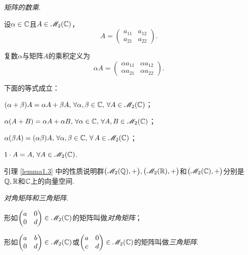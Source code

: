   \begin{definition}
    \emph{矩阵的数乘}.

    设$\alpha\in\mathbb C$且$A\in\mathscr M_2(\mathbb C)$，
    \[
      A = \begin{pmatrix}
        a_{11} & a_{12} \\
        a_{21} & a_{22}
      \end{pmatrix}.
    \]

    复数$\alpha$与矩阵$A$的乘积定义为
    \[
      \alpha A = \begin{pmatrix}
        \alpha a_{11} & \alpha a_{12}\\
        \alpha a_{21} & \alpha a_{22}
      \end{pmatrix}.
    \]
  \end{definition}

  \begin{lemma}
    下面的等式成立：
    \begin{enum}
      \item $(\alpha+\beta)A=\alpha A+\beta A,\,\forall \alpha,\beta\in\mathbb C,\,\forall A\in\mathscr M_2(\mathbb C)$；
      \item $\alpha(A+B)=\alpha A+\alpha B,\,\forall \alpha\in\mathbb C,\,\forall A,B\in\mathscr M_2(\mathbb C)$；
      \item $\alpha(\beta A)=(\alpha\beta)A,\,\forall\alpha,\beta\in\mathbb C,\,\forall
          \,A\in\mathscr M_2(\mathbb C)$；
      \item $1\cdot A=A,\,\forall A\in\mathscr M_2(\mathbb C)$.
    \end{enum}
  \end{lemma}

  \begin{remark}
    引理 \ref{lemma1.3} 中的性质说明群$\big( \mathscr M_2(\mathbb Q),+ \big),\big(\mathscr M_2(\mathbb R),+\big)$和$\big(\mathscr M_2(\mathbb C),+\big)$分别是$\mathbb Q,\mathbb R$和$\mathbb C$上的向量空间.
  \end{remark}

  \begin{definition}
    \emph{对角矩阵和三角矩阵}.
    \begin{eenum}
      \item 形如$\begin{pmatrix}
        a & 0 \\
        0 & d
      \end{pmatrix}\in\mathscr M_2(\mathbb C)$的矩阵叫做\emph{对角矩阵}；
      \item 形如$\begin{pmatrix}
        a & b \\
        0 & d
      \end{pmatrix}\in\mathscr M_2(\mathbb C)$或$\begin{pmatrix}
        a & 0 \\
        c & d
      \end{pmatrix}\in\mathscr M_2(\mathbb C)$的矩阵叫做\emph{三角矩阵}.
    \end{eenum}
  \end{definition}

